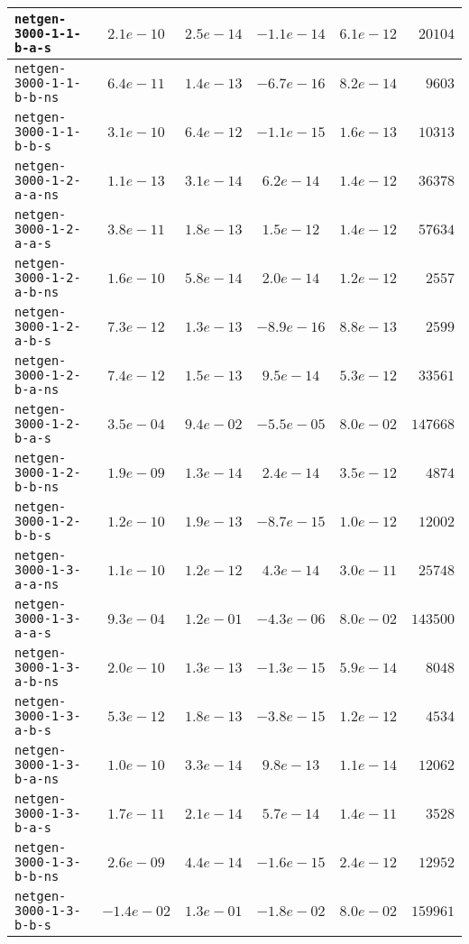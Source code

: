 \begin{center}
\begin{longtable}{|l || c | c | c | c | r|}
\hline
\texttt{netgen-3000-1-1-b-a-s} & $2.1e-10$ & $2.5e-14$ & $-1.1e-14$ & $6.1e-12$ & $20104$ \\
\hline
\texttt{netgen-3000-1-1-b-b-ns} & $6.4e-11$ & $1.4e-13$ & $-6.7e-16$ & $8.2e-14$ & $9603$ \\
\hline
\texttt{netgen-3000-1-1-b-b-s} & $3.1e-10$ & $6.4e-12$ & $-1.1e-15$ & $1.6e-13$ & $10313$ \\
\hline
\texttt{netgen-3000-1-2-a-a-ns} & $1.1e-13$ & $3.1e-14$ & $6.2e-14$ & $1.4e-12$ & $36378$ \\
\hline
\texttt{netgen-3000-1-2-a-a-s} & $3.8e-11$ & $1.8e-13$ & $1.5e-12$ & $1.4e-12$ & $57634$ \\
\hline
\texttt{netgen-3000-1-2-a-b-ns} & $1.6e-10$ & $5.8e-14$ & $2.0e-14$ & $1.2e-12$ & $2557$ \\
\hline
\texttt{netgen-3000-1-2-a-b-s} & $7.3e-12$ & $1.3e-13$ & $-8.9e-16$ & $8.8e-13$ & $2599$ \\
\hline
\texttt{netgen-3000-1-2-b-a-ns} & $7.4e-12$ & $1.5e-13$ & $9.5e-14$ & $5.3e-12$ & $33561$ \\
\hline
\texttt{netgen-3000-1-2-b-a-s} & $3.5e-04$ & $9.4e-02$ & $-5.5e-05$ & $8.0e-02$ & $147668$ \\
\hline
\texttt{netgen-3000-1-2-b-b-ns} & $1.9e-09$ & $1.3e-14$ & $2.4e-14$ & $3.5e-12$ & $4874$ \\
\hline
\texttt{netgen-3000-1-2-b-b-s} & $1.2e-10$ & $1.9e-13$ & $-8.7e-15$ & $1.0e-12$ & $12002$ \\
\hline
\texttt{netgen-3000-1-3-a-a-ns} & $1.1e-10$ & $1.2e-12$ & $4.3e-14$ & $3.0e-11$ & $25748$ \\
\hline
\texttt{netgen-3000-1-3-a-a-s} & $9.3e-04$ & $1.2e-01$ & $-4.3e-06$ & $8.0e-02$ & $143500$ \\
\hline
\texttt{netgen-3000-1-3-a-b-ns} & $2.0e-10$ & $1.3e-13$ & $-1.3e-15$ & $5.9e-14$ & $8048$ \\
\hline
\texttt{netgen-3000-1-3-a-b-s} & $5.3e-12$ & $1.8e-13$ & $-3.8e-15$ & $1.2e-12$ & $4534$ \\
\hline
\texttt{netgen-3000-1-3-b-a-ns} & $1.0e-10$ & $3.3e-14$ & $9.8e-13$ & $1.1e-14$ & $12062$ \\
\hline
\texttt{netgen-3000-1-3-b-a-s} & $1.7e-11$ & $2.1e-14$ & $5.7e-14$ & $1.4e-11$ & $3528$ \\
\hline
\texttt{netgen-3000-1-3-b-b-ns} & $2.6e-09$ & $4.4e-14$ & $-1.6e-15$ & $2.4e-12$ & $12952$ \\
\hline
\texttt{netgen-3000-1-3-b-b-s} & $-1.4e-02$ & $1.3e-01$ & $-1.8e-02$ & $8.0e-02$ & $159961$ \\

\end{longtable}
\end{center}

